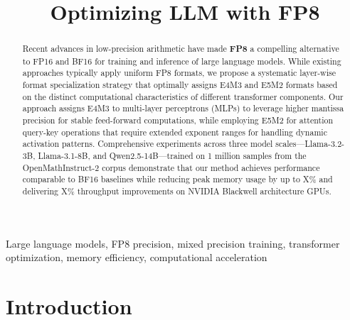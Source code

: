 \documentclass[conference]{IEEEtran}
\begin{document}
\title{Optimizing LLM with FP8}

\author{
\and
{}
}

\maketitle

\begin{abstract}
Recent advances in low-precision arithmetic have made \textbf{FP8} \cite{micikevicius2022fp8formatsdeeplearning} a compelling alternative to FP16 and BF16 for training and inference of large language models. While existing approaches typically apply uniform FP8 formats, we propose a systematic layer-wise format specialization strategy that optimally assigns E4M3 and E5M2 formats based on the distinct computational characteristics of different transformer components. Our approach assigns E4M3 to multi-layer perceptrons (MLPs) to leverage higher mantissa precision for stable feed-forward computations, while employing E5M2 for attention query-key operations that require extended exponent ranges for handling dynamic activation patterns. Comprehensive experiments across three model scales—Llama-3.2-3B, Llama-3.1-8B, and Qwen2.5-14B—trained on 1 million samples from the OpenMathInstruct-2 corpus demonstrate that our method achieves performance comparable to BF16 baselines while reducing peak memory usage by up to X\% and delivering X\% throughput improvements on NVIDIA Blackwell architecture GPUs.
\end{abstract}

\begin{IEEEkeywords}
Large language models, FP8 precision, mixed precision training, transformer optimization, memory efficiency, computational acceleration
\end{IEEEkeywords}

\section{Introduction}
\end{document}
